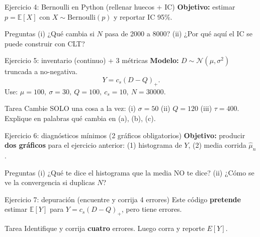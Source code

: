 \documentclass[aspectratio=1610, 9pt]{beamer}
\begin{document}
\begin{frame}[fragile]{Ejercicio 4: Bernoulli en Python (rellenar huecos + IC)}
\small
\textbf{Objetivo:} estimar $p=\mathbb E[X]$ con $X\sim \text{Bernoulli}(p)$ y reportar IC 95\%.


\begin{block}{Preguntas}
(i) ¿Qué cambia si $N$ pasa de 2000 a 8000? \quad
(ii) ¿Por qué aquí el IC se puede construir con CLT?
\end{block}
\end{frame}


\begin{frame}[fragile]{Ejercicio 5: inventario (continuo) + 3 métricas}
\small
\textbf{Modelo:} $D\sim \mathcal N(\mu,\sigma^2)$ truncada a no-negativa.
\[
Y=c_s(D-Q)_+.
\]
Use: $\mu=100,\ \sigma=30,\ Q=100,\ c_s=10,\ N=30000$.


\begin{block}{Tarea}
Cambie SOLO una cosa a la vez:
(i) $\sigma=50$ \quad (ii) $Q=120$ \quad (iii) $\tau=400$.
Explique en palabras qué cambia en (a), (b), (c).
\end{block}
\end{frame}


\begin{frame}[fragile]{Ejercicio 6: diagnósticos mínimos (2 gráficos obligatorios)}
\small
\textbf{Objetivo:} producir \textbf{dos gráficos} para el ejercicio anterior: (1) histograma de $Y$, (2) media corrida $\widehat\mu_n$.


\begin{block}{Preguntas}
(i) ¿Qué te dice el histograma que la media NO te dice? \quad
(ii) ¿Cómo se ve la convergencia si duplicas $N$?
\end{block}
\end{frame}


\begin{frame}[fragile]{Ejercicio 7: depuración (encuentre y corrija 4 errores)}
\small
Este código \textbf{pretende} estimar $\mathbb E[Y]$ para $Y=c_s(D-Q)_+$, pero tiene errores.


\begin{block}{Tarea}
Identifique y corrija \textbf{cuatro} errores. Luego corra y reporte $E[Y]$.
\end{block}
\end{frame}
\end{document}
